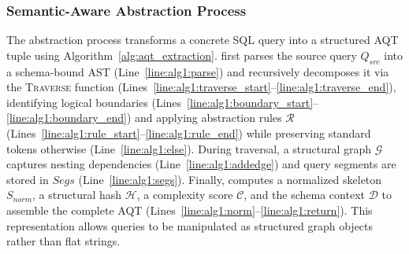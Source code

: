 \documentclass[sigconf,review,anonymous]{acmart}
\begin{document}
\subsubsection{Semantic-Aware Abstraction Process}%

The abstraction process transforms a concrete SQL query into a structured AQT tuple using Algorithm~\ref{alg:aqt_extraction}. 
\tool{} first parses the source query $Q_{src}$ into a schema-bound AST (Line~\ref{line:alg1:parse}) and recursively decomposes it via the \textsc{Traverse} function (Lines~\ref{line:alg1:traverse_start}--\ref{line:alg1:traverse_end}), identifying logical boundaries (Lines~\ref{line:alg1:boundary_start}--\ref{line:alg1:boundary_end}) and applying abstraction rules $\mathcal{R}$ (Lines~\ref{line:alg1:rule_start}--\ref{line:alg1:rule_end}) while preserving standard tokens otherwise (Line~\ref{line:alg1:else}). During traversal, a structural graph $\mathcal{G}$ captures nesting dependencies (Line~\ref{line:alg1:addedge}) and query segments are stored in $Segs$ (Line~\ref{line:alg1:segs}). Finally, \tool{} computes a normalized skeleton $S_{norm}$, a structural hash $\mathcal{H}$, a complexity score $\mathcal{C}$, and the schema context $\mathcal{D}$ to assemble the complete AQT (Lines~\ref{line:alg1:norm}--\ref{line:alg1:return}). This representation allows queries to be manipulated as structured graph objects rather than flat strings.
\end{document}
